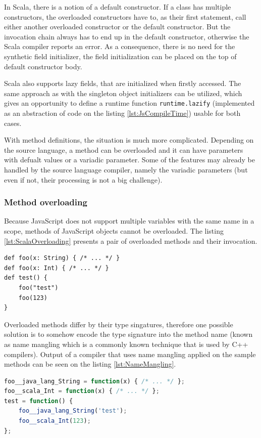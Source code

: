 \documentclass[12pt,a4paper]{report}
\begin{document}
In Scala, there is a notion of a default constructor. If a class has multiple constructors, the overloaded constructors have to, as their first statement, call either another overloaded constructor or the default constructor. But the invocation chain always has to end up in the default constructor, otherwise the Scala compiler reports an error. As a consequence, there is no need for the synthetic field initializer, the field initialization can be placed on the top of default constructor body.

Scala also supports lazy fields, that are initialized when firstly accessed. The same approach as with the singleton object initializers can be utilized, which gives an opportunity to define a runtime function \texttt{runtime.lazify} (implemented as an abstraction of code on the listing \ref{lst:JsCompileTime}) usable for both cases.

With method definitions, the situation is much more complicated. Depending on the source language, a method can be overloaded and it can have parameters with defualt values or a variadic parameter. Some of the features may already be handled by the source language compiler, namely the variadic parameters (but even if not, their processing is not a big challenge).

\subsubsection*{Method overloading}

Because JavaScript does not support multiple variables with the same name in a scope, methods of JavaScript objects cannot be overloaded. The listing \ref{lst:ScalaOverloading} presents a pair of overloaded methods and their invocation.

\begin{lstlisting}[caption={Scala method overloading example.},label={lst:ScalaOverloading}]
def foo(x: String) { /* ... */ }
def foo(x: Int) { /* ... */ }
def test() {
	foo("test")
	foo(123)
}
\end{lstlisting}

Overloaded methods differ by their type singatures, therefore one possible solution is to somehow encode the type signature into the method name (known as name mangling which is a commonly known technique that is used by C++ compilers). Output of a compiler that uses name mangling applied on the sample methods can be seen on the listing \ref{lst:NameMangling}.

\begin{lstlisting}[language=JavaScript,caption={Overloading solved by name mangling.},label={lst:NameMangling}]
foo__java_lang_String = function(x) { /* ... */ };
foo__scala_Int = function(x) { /* ... */ };
test = function() {
	foo__java_lang_String('test');
	foo__scala_Int(123);
};
\end{lstlisting}
\end{document}
